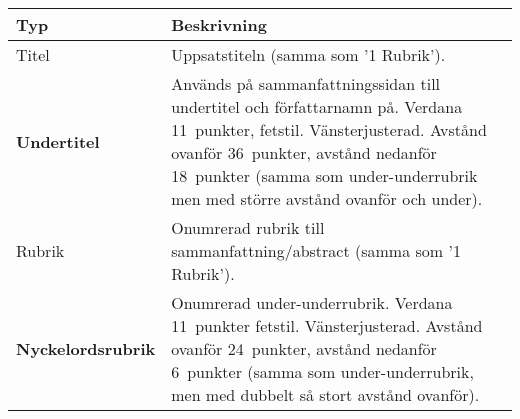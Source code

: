 \begin{tabular}{p{} p{}}
  \toprule
  {\sffamily\textbf{Typ}} &
  {\sffamily\textbf{Beskrivning}} \\
  \midrule
  {\sffamily\Large{}Titel} &
  Uppsatstiteln (samma som '1 Rubrik').
  \\
  \midrule
  {\sffamily\textbf{Undertitel}} &
  Används på sammanfattningssidan till undertitel och författarnamn på.
  Verdana 11~punkter, fetstil. Vänsterjusterad.
  Avstånd ovanför 36~punkter, avstånd nedanför 18~punkter (samma som
  under-underrubrik men med större avstånd ovanför och under).
  \\
  \midrule
  {\sffamily\Large{}Rubrik} &
  Onumrerad rubrik till sammanfattning/abstract
  (samma som '1 Rubrik').
  \\
  \midrule
  {\sffamily\textbf{Nyckelordsrubrik}} &
  Onumrerad under-underrubrik. Verdana 11~punkter fetstil. Vänsterjusterad.
  Avstånd ovanför 24~punkter, avstånd nedanför 6~punkter (samma som
  under-underrubrik, men med dubbelt så stort avstånd ovanför).
  \\
  \bottomrule
\end{tabular}




